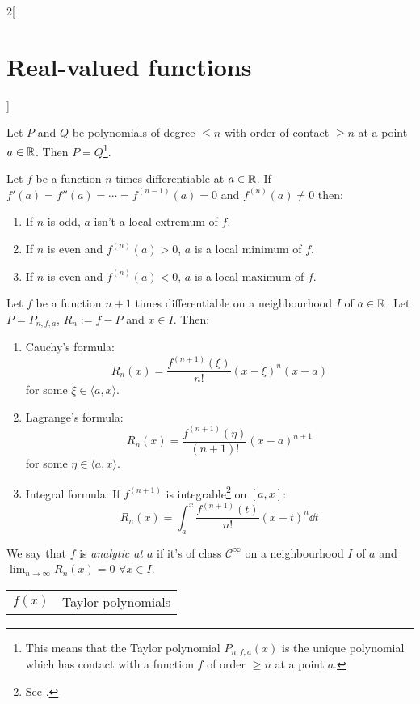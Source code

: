 \documentclass[../../../main_math.tex]{subfiles}
\begin{document}
\begin{multicols}{2}[\section{Real-valued functions}]
\begin{theorem}
  \end{theorem}
  \begin{proposition}
    Let $P$ and $Q$ be polynomials of degree $\leq n$ with order of contact $\geq n$ at a point $a\in\mathbb{R}$. Then $P=Q$\footnote{This means that the Taylor polynomial $P_{n,f,a}(x)$ is the unique polynomial which has contact with a function $f$ of order $\geq n$ at a point $a$.}.
  \end{proposition}
  \begin{theorem}
    Let $f$ be a function $n$ times differentiable at $a\in\mathbb{R}$. If $f'(a)=f''(a)=\cdots=f^{(n-1)}(a)=0$ and $f^{(n)}(a)\ne 0$ then:
    \begin{enumerate}
      \item If $n$ is odd, $a$ isn't a local extremum of $f$.
      \item If $n$ is even and $f^{(n)}(a)>0$, $a$ is a local minimum of $f$.
      \item If $n$ is even and $f^{(n)}(a)<0$, $a$ is a local maximum of $f$.
    \end{enumerate}
  \end{theorem}
  \begin{theorem}
    Let $f$ be a function $n+1$ times differentiable on a neighbourhood $I$ of $a\in\mathbb{R}$. Let $P=P_{n,f,a}$, $R_n:=f-P$ and $x\in I$. Then:
    \begin{enumerate}
      \item Cauchy's formula: $$R_n(x)=\frac{f^{(n+1)}(\xi)}{n!}{(x-\xi)}^n(x-a)$$ for some $\xi\in\langle a,x\rangle$.
      \item Lagrange's formula: $$R_n(x)=\frac{f^{(n+1)}(\eta)}{(n+1)!}{(x-a)}^{n+1}$$ for some $\eta\in\langle a,x\rangle$.
      \item Integral formula: If $f^{(n+1)}$ is integrable\footnote{See .} on $[a,x]$: $$R_n(x)=\int_a^x\frac{f^{(n+1)}(t)}{n!}{(x-t)}^n\dd{t}$$
    \end{enumerate}
  \end{theorem}
  \begin{definition}
    We say that $f$ is \emph{analytic at $a$} if it's of class $\mathcal{C}^\infty$ on a neighbourhood $I$ of $a$ and $\displaystyle\lim_{n\to\infty}R_n(x)=0$  $\forall x\in I$.
  \end{definition}
  \begin{center}
    \renewcommand*{\arraystretch}{2}
    \begin{tabular}{|c|>{\centering\arraybackslash}m{6.5cm}|}
      \hline
      $f(x)$                       & Taylor polynomials                                                                                     \\

\end{tabular}
\end{center}
\end{multicols}
\end{document}
